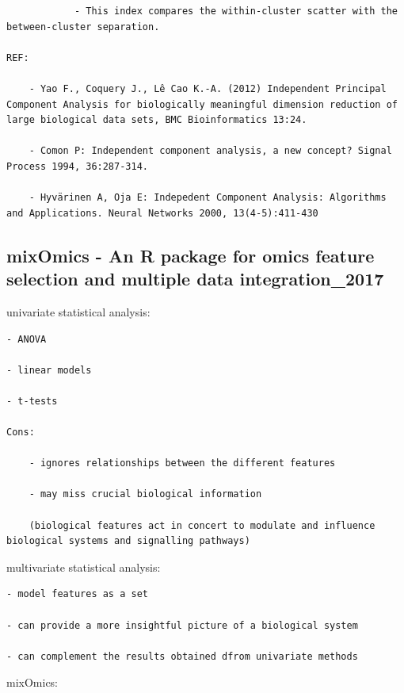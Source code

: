 \documentclass[
]{book}
\begin{document}
\begin{verbatim}
            - This index compares the within-cluster scatter with the between-cluster separation.

REF:

    - Yao F., Coquery J., Lê Cao K.-A. (2012) Independent Principal Component Analysis for biologically meaningful dimension reduction of large biological data sets, BMC Bioinformatics 13:24.

    - Comon P: Independent component analysis, a new concept? Signal Process 1994, 36:287-314.

    - Hyvärinen A, Oja E: Indepedent Component Analysis: Algorithms and Applications. Neural Networks 2000, 13(4-5):411-430
\end{verbatim}

\hypertarget{mixomics---an-r-package-for-omics-feature-selection-and-multiple-data-integration_2017}{%
\subsection{mixOmics - An R package for omics feature selection and multiple data integration\_2017}\label{mixomics---an-r-package-for-omics-feature-selection-and-multiple-data-integration_2017}}

univariate statistical analysis:

\begin{verbatim}
- ANOVA

- linear models

- t-tests

Cons:

    - ignores relationships between the different features

    - may miss crucial biological information

    (biological features act in concert to modulate and influence biological systems and signalling pathways)
\end{verbatim}

multivariate statistical analysis:

\begin{verbatim}
- model features as a set

- can provide a more insightful picture of a biological system

- can complement the results obtained dfrom univariate methods
\end{verbatim}

mixOmics:
\end{document}
